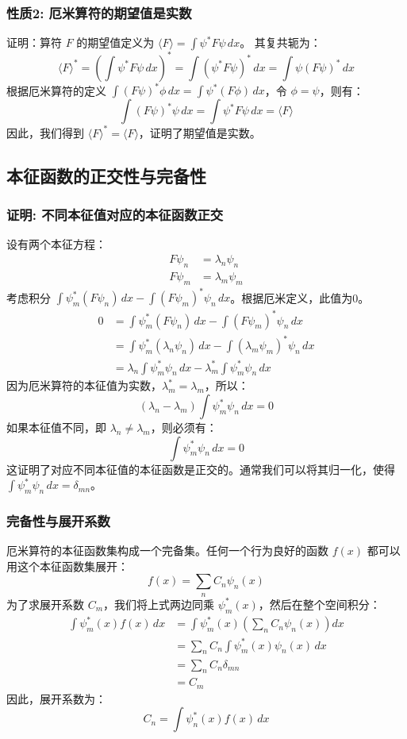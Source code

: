 \documentclass{article}
\begin{document}
	\subsubsection*{性质2: 厄米算符的期望值是实数}
	证明：算符 $F$ 的期望值定义为 $\langle F \rangle = \int \psi^* F\psi \,dx$。
	其复共轭为：
	$$ \langle F \rangle^* = \left( \int \psi^* F\psi \,dx \right)^* = \int (\psi^* F\psi)^* \,dx = \int \psi (F\psi)^* \,dx $$
	根据厄米算符的定义 $\int (F\psi)^* \phi \,dx = \int \psi^* (F\phi) \,dx$，令 $\phi = \psi$，则有：
	$$ \int (F\psi)^* \psi \,dx = \int \psi^* F\psi \,dx = \langle F \rangle $$
	因此，我们得到 $\langle F \rangle^* = \langle F \rangle$，证明了期望值是实数。
	
	\subsection{本征函数的正交性与完备性}
	\subsubsection*{证明: 不同本征值对应的本征函数正交}
	设有两个本征方程：
	\begin{align*}
		F\psi_n &= \lambda_n \psi_n \\
		F\psi_m &= \lambda_m \psi_m
	\end{align*}
	考虑积分 $\int \psi_m^* (F\psi_n) \,dx - \int (F\psi_m)^* \psi_n \,dx$。根据厄米定义，此值为0。
	\begin{align*}
		0 &= \int \psi_m^* (F\psi_n) \,dx - \int (F\psi_m)^* \psi_n \,dx \\
		&= \int \psi_m^* (\lambda_n \psi_n) \,dx - \int (\lambda_m \psi_m)^* \psi_n \,dx \\
		&= \lambda_n \int \psi_m^* \psi_n \,dx - \lambda_m^* \int \psi_m^* \psi_n \,dx
	\end{align*}
	因为厄米算符的本征值为实数，$\lambda_m^* = \lambda_m$，所以：
	$$ (\lambda_n - \lambda_m) \int \psi_m^* \psi_n \,dx = 0 $$
	如果本征值不同，即 $\lambda_n \neq \lambda_m$，则必须有：
	$$ \int \psi_m^* \psi_n \,dx = 0 $$
	这证明了对应不同本征值的本征函数是正交的。通常我们可以将其归一化，使得 $\int \psi_m^* \psi_n \,dx = \delta_{mn}$。
	
	\subsubsection*{完备性与展开系数}
	厄米算符的本征函数集构成一个完备集。任何一个行为良好的函数 $f(x)$ 都可以用这个本征函数集展开：
	$$ f(x) = \sum_n C_n \psi_n(x) $$
	为了求展开系数 $C_m$，我们将上式两边同乘 $\psi_m^*(x)$，然后在整个空间积分：
	\begin{align*}
		\int \psi_m^*(x) f(x) \,dx &= \int \psi_m^*(x) \left( \sum_n C_n \psi_n(x) \right) dx \\
		&= \sum_n C_n \int \psi_m^*(x) \psi_n(x) \,dx \\
		&= \sum_n C_n \delta_{mn} \\
		&= C_m
	\end{align*}
	因此，展开系数为：
	$$ C_n = \int \psi_n^*(x) f(x) \,dx $$
	
\end{document}
